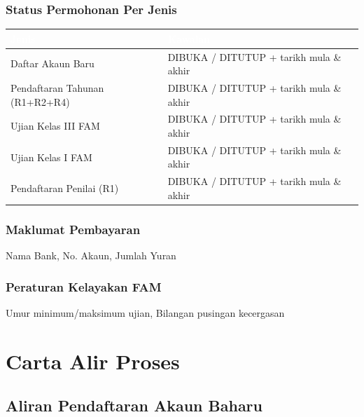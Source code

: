 \documentclass[12pt,a4paper]{report}
\begin{document}
\subsection{Status Permohonan Per Jenis}

\begin{table}[H]
\centering
{}
\begin{tabularx}{\textwidth}{l X}
\toprule
\rowcolor{tableheader}
\textcolor{white}{\textbf{Jenis}} & \textcolor{white}{\textbf{Kawalan}} \\
\midrule
Daftar Akaun Baru & DIBUKA / DITUTUP + tarikh mula \& akhir \\
Pendaftaran Tahunan (R1+R2+R4) & DIBUKA / DITUTUP + tarikh mula \& akhir \\
Ujian Kelas III FAM & DIBUKA / DITUTUP + tarikh mula \& akhir \\
Ujian Kelas I FAM & DIBUKA / DITUTUP + tarikh mula \& akhir \\
Pendaftaran Penilai (R1) & DIBUKA / DITUTUP + tarikh mula \& akhir \\
\bottomrule
\end{tabularx}
\end{table}

\subsection{Maklumat Pembayaran}
Nama Bank, No. Akaun, Jumlah Yuran

\subsection{Peraturan Kelayakan FAM}
Umur minimum/maksimum ujian, Bilangan pusingan kecergasan

\chapter{Carta Alir Proses}

\section{Aliran Pendaftaran Akaun Baharu}
\end{document}
